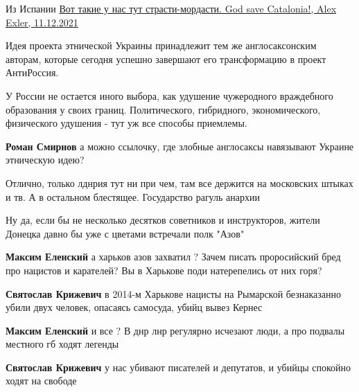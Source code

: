 \begin{itemize}
Из Испании
\href{https://www.facebook.com/exler.alex/posts/10159453141379323}{%
Вот такие у нас тут страсти-мордасти. God save Catalonia!, Alex Exler, 11.12.2021%
}


Идея проекта этнической Украины принадлежит тем же англосаксонским авторам,
которые сегодня успешно завершают его трансформацию в проект АнтиРоссия.

У России не остается иного выбора, как удушение чужеродного враждебного
образования у своих границ. Политического, гибридного, экономического,
физического удушения - тут уж все способы приемлемы.

\textbf{Роман Смирнов} а можно ссылочку, где злобные англосаксы навязывают Украине этническую идею?


Отлично, только лднрия тут ни при чем, там все держится на московских штыках и
тв. А в остальном блестящее. Государство рагуль анархии

\begin{itemize} %
Ну да, если бы не несколько десятков советников и инструкторов, жители Донецка давно бы уже с цветами встречали полк "Азов"

\textbf{Максим Еленский} а харьков азов захватил ? Зачем писать проросийский бред про нацистов и карателей? Вы в Харькове поди натерепелись от них горя?

\textbf{Святослав Крижевич} в 2014-м Харькове нацисты на Рымарской безнаказанно убили двух человек, опасаясь самосуда, убийц вывез Кернес

\textbf{Максим Еленский} и все ? В днр лнр регулярно исчезают люди, а про подвалы местного гб ходят легенды

\textbf{Святослав Крижевич} у нас убивают писателей и депутатов, и убийцы спокойно ходят на свободе
\end{itemize} %

\end{itemize} %
